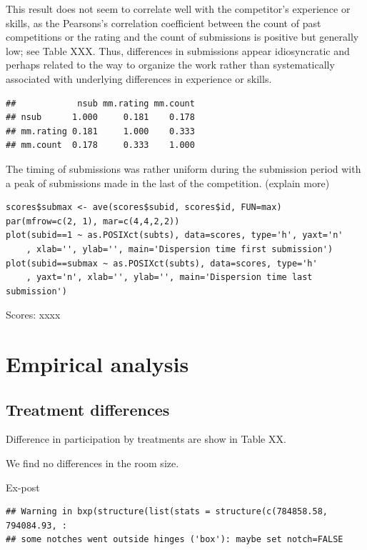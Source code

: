 \documentclass[12pt,]{article}
\begin{document}
This result does not seem to correlate well with the competitor's
experience or skills, as the Pearsons's correlation coefficient between
the count of past competitions or the rating and the count of
submissions is positive but generally low; see Table XXX. Thus,
differences in submissions appear idiosyncratic and perhaps related to
the way to organize the work rather than systematically associated with
underlying differences in experience or skills.

\begin{verbatim}
##            nsub mm.rating mm.count
## nsub      1.000     0.181    0.178
## mm.rating 0.181     1.000    0.333
## mm.count  0.178     0.333    1.000
\end{verbatim}

The timing of submissions was rather uniform during the submission
period with a peak of submissions made in the last of the competition.
(explain more)

\begin{verbatim}
scores$submax <- ave(scores$subid, scores$id, FUN=max)
par(mfrow=c(2, 1), mar=c(4,4,2,2))
plot(subid==1 ~ as.POSIXct(subts), data=scores, type='h', yaxt='n'
    , xlab='', ylab='', main='Dispersion time first submission')
plot(subid==submax ~ as.POSIXct(subts), data=scores, type='h'
    , yaxt='n', xlab='', ylab='', main='Dispersion time last submission')
\end{verbatim}

Scores: xxxx

\section{Empirical analysis}\label{empirical-analysis}

\subsection{Treatment differences}\label{treatment-differences}

Difference in participation by treatments are show in Table XX.

We find no differences in the room size.

Ex-post

\begin{verbatim}
## Warning in bxp(structure(list(stats = structure(c(784858.58, 794084.93, :
## some notches went outside hinges ('box'): maybe set notch=FALSE
\end{verbatim}
\end{document}
